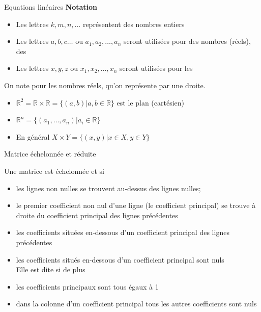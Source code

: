 \begin{parag}{Equations linéaires}
    \textbf{Notation}
    \begin{itemize}
        \item Les lettres $k, m, n, \dots$ représentent des nombres entiers
        \item Les lettres $a, b, c\dots$ ou $a_1, a_2, \dots, a_n$ seront utilisées pour des nombres (réels), des 
        \item Les lettres $x, y, z$ ou $x_1, x_2, \dots, x_n$ seront utilisées pour les 
    \end{itemize}

    On note \R pour les nombres réels, qu'on représente par une droite.
    \begin{itemize}
        \item $\mathbb{R}^2 = \mathbb{R} \times \mathbb{R} = \{(a, b) | a, b \in \mathbb{R}\}$ est le plan (cartésien)
        \item $\mathbb{R}^n = \{(a_1, \dots, a_n)|a_i \in \mathbb{R}\}$
        \item En général $X \times Y = \{(x, y)| x \in X, y \in Y\}$
    \end{itemize}
\end{parag}
\begin{parag}{Matrice échelonnée et réduite}
    \begin{definition}
        Une matrice est échelonnée et  si
        \begin{itemize}
            \item les lignes non nulles se trouvent au-dessus des lignes nulles;
            \item le premier coefficient non nul d'une ligne (le coefficient principal) se trouve à droite du coefficient principal des lignes précédentes
            \item les coefficients situées en-dessous d'un coefficient principal des lignes précédentes
            \item les coefficients situés en-dessous d'un coefficient principal sont nuls
            \\
            Elle est dite  si de plus
            \item les coefficients principaux sont tous égaux à 1
            \item  dans la colonne d'un coefficient principal tous les autres coefficients sont nuls
        \end{itemize}
    \end{definition}
\end{parag}


